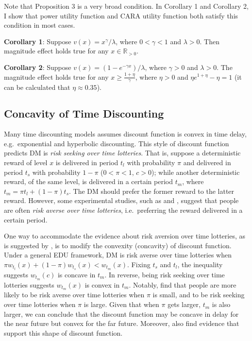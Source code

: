 \documentclass[
  12pt,
]{article}
\begin{document}
Note that Proposition 3 is a very broad condition. In Corollary 1 and
Corollary 2, I show that power utility function and CARA utility
function both satisfy this condition in most cases.

\textbf{Corollary 1}: Suppose \(v(x)=x^\gamma/\lambda\), where
\(0<\gamma<1\) and \(\lambda>0\). Then magnitude effect holds true for
any \(x\in \mathbb{R}_{>0}\).

\textbf{Corollary 2}: Suppose \(v(x)=(1-e^{-\gamma x})/\lambda\), where
\(\gamma>0\) and \(\lambda>0\). The magnitude effect holds true for any
\(x\geq \frac{1+\eta}{\gamma}\), where \(\eta>0\) and
\(\eta e^{1+\eta}-\eta=1\) (it can be calculated that
\(\eta \approx 0.35\)).

\hypertarget{concavity-of-time-discounting}{%
\subsection{Concavity of Time
Discounting}\label{concavity-of-time-discounting}}

Many time discounting models assumes discount function is convex in time
delay, e.g.~exponential and hyperbolic discounting. This style of
discount function predicts DM is \emph{risk seeking over time
lotteries}. That is, suppose a deterministic reward of level \(x\) is
delivered in period \(t_l\) with probability \(\pi\) and delivered in
period \(t_s\) with probability \(1-\pi\) (\(0<\pi<1\), \(c>0\)); while
another deterministic reward, of the same level, is delivered in a
certain period \(t_m\), where \(t_m=\pi t_l +(1-\pi) t_s\). The DM
should prefer the former reward to the latter reward. However, some
experimental studies, such as \citet{onay_intertemporal_2007} and
\citet{dejarnette_time_2020}, suggest that people are often \emph{risk
averse over time lotteries}, i.e.~preferring the reward delivered in a
certain period.

One way to accommodate the evidence about risk aversion over time
lotteries, as is suggested by \citet{dejarnette_time_2020}, is to modify
the convexity (concavity) of discount function. Under a general EDU
framework, DM is risk averse over time lotteries when
\(\pi w_{t_l}(x)+(1-\pi)w_{t_s}(x)<w_{t_m}(x)\). Fixing \(t_s\) and
\(t_l\), the inequality suggests \(w_{t_m}(c)\) is concave in \(t_m\).
In reverse, being risk seeking over time lotteries suggests
\(w_{t_m}(x)\) is convex in \(t_m\). Notably,
\citet{onay_intertemporal_2007} find that people are more likely to be
risk averse over time lotteries when \(\pi\) is small, and to be risk
seeking over time lotteries when \(\pi\) is large. Given that when
\(\pi\) gets larger, \(t_m\) is also larger, we can conclude that the
discount function may be concave in delay for the near future but convex
for the far future. Moreover, \citet{takeuchi_non-parametric_2011} also
find evidence that support this shape of discount function.
\end{document}
